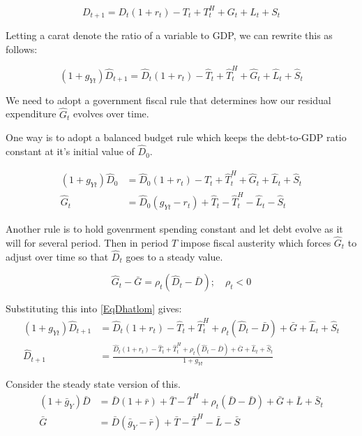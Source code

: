 \documentclass[letterpaper,12pt]{article}
\theoremstyle{definition}
\begin{document}
\begin{spacing}{1.5}
      \begin{equation}
        D_{t+1} = D_t(1+r_t) - T_t + T^H_t + G_t + L_t + S_t
      \end{equation}

      Letting a carat denote the ratio of a variable to GDP, we can rewrite this as follows:

      \begin{equation} \label{EqDhatlom}
        (1+g_{Yt}) \hat D_{t+1} = \hat D_t(1+r_t) - \hat T_t + \hat T^H_t + \hat G_t + \hat L_t + \hat S_t
      \end{equation}

      We need to adopt a government fiscal rule that determines how our residual expenditure $\hat G_t$ evolves over time.

      One way is to adopt a balanced budget rule which keeps the debt-to-GDP ratio constant at it's initial value of $\hat D_0$.

      \begin{align}
        (1+g_{Yt}) \hat D_0 & = \hat D_0(1+r_t) - \hat T_t + \hat T^H_t + \hat G_t + \hat L_t + \hat S_t \nonumber \\
        \hat G_t & = \hat D_0(g_{Yt}-r_t) + \hat T_t - \hat T^H_t -\hat L_t - \hat S_t \label{EqBalBudRule}
      \end{align}

      Another rule is to hold govenrment spending constant and let debt evolve as it will for several period.  Then in period $T$ impose fiscal austerity which forces $\hat G_t$ to adjust over time so that $\hat D_t$ goes to a steady value.

      \begin{equation}
        \hat G_t - \bar G = \rho_t (\hat D_t - \bar D);\quad \rho_t<0 \label{EqAdjRule}
      \end{equation}

      Substituting this into \eqref{EqDhatlom} gives:
      \begin{align}
        (1+g_{Yt}) \hat D_{t+1} & = \hat D_t(1+r_t) - \hat T_t + \hat T^H_t + \rho_t (\hat D_t - \bar D) + \bar G + \hat L_t + \hat S_t \nonumber \\
        \hat D_{t+1} & = \frac{\hat D_t(1+r_t) - \hat T_t + \hat T^H_t + \rho_t (\hat D_t - \bar D) + \bar G + \hat L_t + \hat S_t }{1+g_{Yt}} \label{EqDhatlom2}
      \end{align}

      Consider the steady state version of this.
      \begin{align}
        (1+\bar g_{Y}) \bar D & = \bar D(1+\bar r) + \bar T - \bar T^H + \rho_t (\bar D - \bar D) + \bar G + \bar L + \bar S_t  \nonumber \\
        \bar G & = \bar D(\bar g_{Y} -\bar r) + \bar T - \bar T^H - \bar L - \bar S  \label{EqGbardef}
      \end{align}


\end{spacing}
\end{document}
